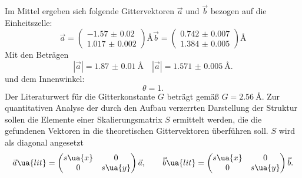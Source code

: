 Im Mittel ergeben sich folgende Gittervektoren $\vec{a}$ und $\vec{b}$ bezogen auf die Einheitszelle:
\begin{equation}
  \vec{a} = \begin{pmatrix} \num{-1.57(2)} \\  \num{1.017(2)} \end{pmatrix}\si{\angstrom}
  \vec{b} = \begin{pmatrix} \num{0.742(7)} \\  \num{1.384(5)} \end{pmatrix}\si{\angstrom}
\end{equation}
Mit den Beträgen
\begin{equation}
  \left|\vec{a}\right| = \SI{1.87(1)}{\angstrom} \quad \left|\vec{a}\right| = \SI{1.571(5)}{\angstrom}.
  \label{eq: mittlere_gittervektoren}
\end{equation}
und dem Innenwinkel:
\begin{equation}
  \theta = 1.
\end{equation}
Der Literaturwert für die Gitterkonstante $G$ beträgt gemäß \cite{} $G = \SI{2.56}{\angstrom}$. Zur quantitativen Analyse
der durch den Aufbau verzerrten Darstellung der Struktur sollen die Elemente einer Skalierungsmatrix $S$ ermittelt werden, die
die gefundenen Vektoren in die theoretischen Gittervektoren überführen soll. $S$ wird als diagonal angesetzt
\begin{equation}
  \vec{a}\ua{lit} = \begin{pmatrix} s\ua{x} & 0 \\  0  &   s\ua{y} \end{pmatrix} \vec{a},
  \qquad \vec{b}\ua{lit} = \begin{pmatrix} s\ua{x} & 0 \\  0  &   s\ua{y} \end{pmatrix} \vec{b}.
\end{equation}
